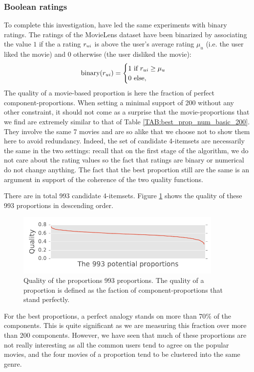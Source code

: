 \subsubsection{Boolean ratings}

To complete this investigation, have led the same experiments with binary
ratings. The ratings of the MovieLens dataset have been binarized by
associating the value $1$ if the a rating $r_{ui}$ is above the user's average
rating $\mu_u$ (i.e. the user liked the movie) and $0$ otherwise (the user disliked the
movie):
$$\text{binary}(r_{ui}) =
\begin{cases}
  1 \text{ if } r_{ui} \geq \mu_u\\
  0 \text{ else},
\end{cases}
$$
The quality of a movie-based proportion is here the fraction of perfect
component-proportions. When setting a minimal support of 200 without any other
constraint, it should not come as a surprise that the movie-proportions that we
find are extremely similar to that of Table \ref{TAB:best_prop_num_basic_200}.
They involve the same 7 movies and are so alike that we choose not to show them
here to avoid redundancy. Indeed, the set of candidate 4-itemsets are
necessarily the same in the two settings: recall that on the first stage of the
algorithm, we do not care about the rating values so the fact that ratings are
binary or numerical do not change anything. The fact that the best proportion
still are the same is an argument in support of the coherence of the two
quality functions.

There are in total 993 candidate 4-itemsets. Figure
\ref{FIG:quality_proportions} shows the quality of these 993 proportions in
descending order.
\begin{figure}[!h]
\centering
  \includegraphics[width=4in]{figures/quality_of_proportions.pdf}
  \caption{Quality of the proportions 993 proportions. The quality of a
  proportion is defined as the faction of component-proportions that stand
  perfectly.}
\label{FIG:quality_proportions}
\end{figure}
For the best proportions, a perfect analogy stands on more than 70\% of the
components. This is quite significant as we are measuring this fraction over
more than 200 components. However, we have seen that much of these proportions
are not really interesting as all the common users tend to agree on the popular
movies, and the four movies of a proportion tend to be clustered into the same
genre.

